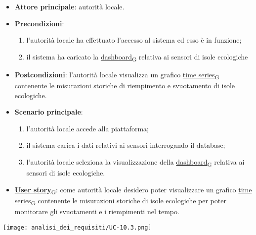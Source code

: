 \begin{itemize}
	\item \textbf{Attore principale}: autorità locale.
	\item \textbf{Precondizioni}:
	      \begin{enumerate}
		      \item l'autorità locale ha effettuato l'accesso al sistema ed esso è in funzione;
		      \item il sistema ha caricato la \href{https://7last.github.io/docs/pb/documentazione-interna/glossario\#dashboard}{dashboard\textsubscript{G}} relativa ai sensori di isole ecologiche
	      \end{enumerate}
	\item \textbf{Postcondizioni}: l'autorità locale visualizza un grafico \href{https://7last.github.io/docs/pb/documentazione-interna/glossario\#time-series}{time series\textsubscript{G}} contenente le misurazioni storiche di riempimento e svuotamento
	      di isole ecologiche.
	\item \textbf{Scenario principale}:
	      \begin{enumerate}
		      \item l'autorità locale accede alla piattaforma;
		      \item il sistema carica i dati relativi ai sensori interrogando il database;
		      \item l'autorità locale seleziona la visualizzazione della \href{https://7last.github.io/docs/pb/documentazione-interna/glossario\#dashboard}{dashboard\textsubscript{G}} relativa ai sensori di isole ecologiche.
	      \end{enumerate}
	\item \href{https://7last.github.io/docs/pb/documentazione-interna/glossario\#user-story}{\textbf{User story}\textsubscript{G}}:
	      come autorità locale desidero poter visualizzare un grafico \href{https://7last.github.io/docs/pb/documentazione-interna/glossario\#time-series}{time series\textsubscript{G}} contenente le misurazioni storiche
	      di isole ecologiche per poter monitorare gli svuotamenti e i riempimenti nel tempo.
\end{itemize}
\begin{center}
	\texttt{[image: analisi\_dei\_requisiti/UC-10.3.png]}
\end{center}


